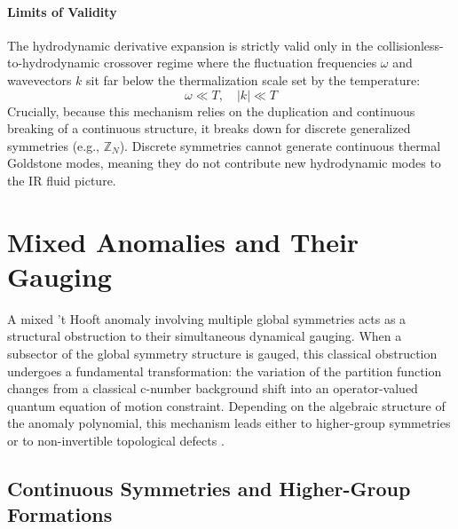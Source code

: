 \documentclass[aps,preprint,nofootinbib,preprintnumbers,eqsecnum,superscriptaddress]{revtex4}
\numberwithin{equation}{section}
\begin{document}
\paragraph{Limits of Validity}
The hydrodynamic derivative expansion is strictly valid only in the collisionless-to-hydrodynamic crossover regime where the fluctuation frequencies $\omega$ and wavevectors $k$ sit far below the thermalization scale set by the temperature:
\begin{equation}
    \omega \ll T, \quad |k| \ll T
\end{equation}
Crucially, because this mechanism relies on the duplication and continuous breaking of a continuous structure, it breaks down for discrete generalized symmetries (e.g., $\mathbb{Z}_N$). Discrete symmetries cannot generate continuous thermal Goldstone modes, meaning they do not contribute new hydrodynamic modes to the IR fluid picture.

\newpage 

\section{Mixed Anomalies and Their Gauging}
\label{sec:mixed_anomaly_to_gen_sym}

A mixed 't Hooft anomaly involving multiple global symmetries acts as a structural obstruction to their simultaneous dynamical gauging. When a subsector of the global symmetry structure is gauged, this classical obstruction undergoes a fundamental transformation: the variation of the partition function changes from a classical c-number background shift into an operator-valued quantum equation of motion constraint. Depending on the algebraic structure of the anomaly polynomial, this mechanism leads either to higher-group symmetries or to non-invertible topological defects \cite{Kaidi_2022, Bhardwaj_2023, Antinucci_2025}.

\subsection{Continuous Symmetries and Higher-Group Formations}
\label{sec:continuous_higher_groups}
\end{document}
